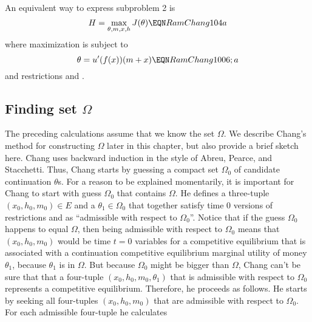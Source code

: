 An equivalent way to express subproblem 2 is
$$ H=  \max_{\theta, m, x, h} J(\theta) \EQN RamChang104a  $$
where maximization is subject to
$$  \theta  = u'(f(x))(m + x) \EQN RamChang1006;a $$
and restrictions  and .

\subsection{Finding set  $\Omega$}\label{sec:Chang_set_101}%
The preceding calculations assume that we know the set $\Omega$.  We describe Chang's method for constructing $\Omega$ later in this chapter, but also provide a   brief sketch  here. Chang uses  backward induction in the style of Abreu, Pearce, and Stacchetti.
 Thus, Chang starts by guessing a compact set $\Omega_0$ of candidate continuation $\theta$s.  For a reason to be explained momentarily, it is important for Chang to start with
 guess $\Omega_0$ that contains $\Omega$.
 He defines  a three-tuple
  $(x_0, h_0, m_0) \in E$ and a
 $\theta_1 \in \Omega_0$ that together satisfy time $0$ versions of restrictions  %
 and  %
    as ``admissible with respect to $\Omega_0$''.  Notice that if the guess $\Omega_0$ happens to  equal $\Omega$, then being admissible with respect to $\Omega_0$ means
 that $(x_0, h_0, m_0)$ would be    time $t=0$  variables for  a competitive equilibrium that is associated with a continuation competitive equilibrium
 marginal utility of money $\theta_1$, because $\theta_1$ is in $\Omega$. But  because   $\Omega_0$ might be bigger than  $\Omega$, Chang can't be sure that that  a four-tuple $(x_0, h_0, m_0,\theta_1)$ that is  admissible with respect to $\Omega_0$ represents  a
 competitive equilibrium.
 Therefore,  he proceeds as follows.  He starts by  seeking all four-tuples $(x_0, h_0, m_0)$ that are admissible with respect to $\Omega_0$. For each admissible four-tuple he calculates

